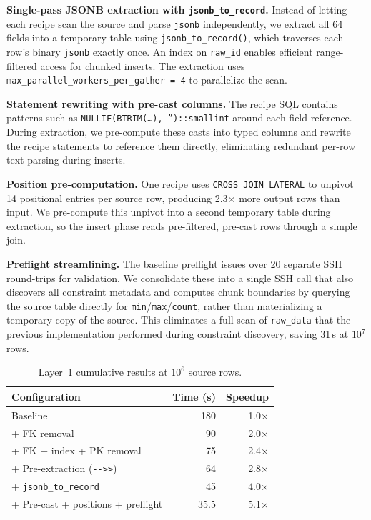 \documentclass[journal]{IEEEtran}
\begin{document}
\textbf{Single-pass JSONB extraction with \texttt{jsonb\_to\_record}.}
Instead of letting each recipe scan the source and parse \texttt{jsonb} independently, we extract all 64 fields into a temporary table using \texttt{jsonb\_to\_record()}, which traverses each row's binary \texttt{jsonb} exactly once.
An index on \texttt{raw\_id} enables efficient range-filtered access for chunked inserts.
The extraction uses \texttt{max\_parallel\_workers\_per\_gather\,=\,4} to parallelize the scan.

\textbf{Statement rewriting with pre-cast columns.}
The recipe SQL contains patterns such as \texttt{NULLIF(BTRIM(\ldots),\,'')\allowbreak::smallint} around each field reference.
During extraction, we pre-compute these casts into typed columns and rewrite the recipe statements to reference them directly, eliminating redundant per-row text parsing during inserts.

\textbf{Position pre-computation.}
One recipe uses \texttt{CROSS JOIN LATERAL} to unpivot 14 positional entries per source row, producing 2.3$\times$ more output rows than input.
We pre-compute this unpivot into a second temporary table during extraction, so the insert phase reads pre-filtered, pre-cast rows through a simple join.

\textbf{Preflight streamlining.}
The baseline preflight issues over 20 separate SSH round-trips for validation.
We consolidate these into a single SSH call that also discovers all constraint metadata and computes chunk boundaries by querying the source table directly for \texttt{min}/\texttt{max}/\texttt{count}, rather than materializing a temporary copy of the source.
This eliminates a full scan of \texttt{raw\_data} that the previous implementation performed during constraint discovery, saving 31\,s at $10^7$ rows.

\begin{table}[!ht]
\centering
\caption{Layer~1 cumulative results at $10^6$ source rows.}
\label{tab:layer1}
\begin{tabular}{lrr}
\toprule
\textbf{Configuration} & \textbf{Time (s)} & \textbf{Speedup} \\
\midrule
Baseline                         & 180   & 1.0$\times$ \\
+ FK removal                     & 90    & 2.0$\times$ \\
+ FK + index + PK removal        & 75    & 2.4$\times$ \\
+ Pre-extraction (\texttt{-{}->>}) & 64  & 2.8$\times$ \\
+ \texttt{jsonb\_to\_record}     & 45    & 4.0$\times$ \\
+ Pre-cast + positions + preflight & 35.5 & 5.1$\times$ \\
\bottomrule
\end{tabular}
\end{table}
\end{document}
